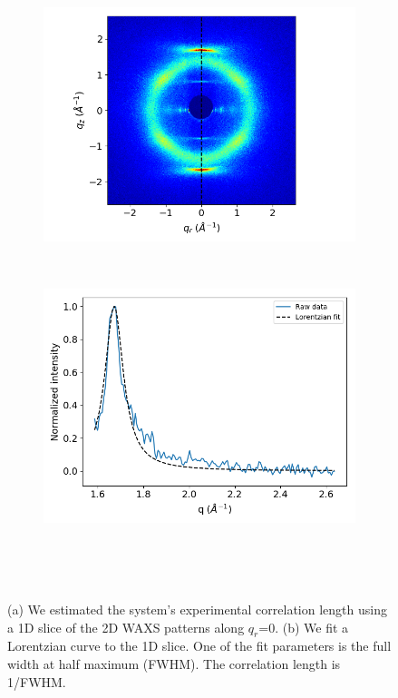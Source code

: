 \documentclass[journal=jpcbfk,manusciprt=article]{achemso}
\begin{document}
  \begin{figure}[!htb]
  \centering
  \begin{subfigure}{0.45\textwidth}	
  	\includegraphics[width=\textwidth]{waxs_dashed.png}
	\caption{}~\label{fig:waxs_dashed}
  \end{subfigure}
  \begin{subfigure}{0.45\textwidth}
	\includegraphics[width=\textwidth]{Correlation_length_exp.png}
	\caption{}~\label{fig:correlation_length_exp}
  \end{subfigure}
  \caption{(a) We estimated the system's experimental correlation length using a 
  1D slice of the 2D WAXS patterns along $q_r$=0. (b) We fit a Lorentzian curve 
  to the 1D slice. One of the fit parameters is the full width at half maximum (FWHM).
  The correlation length is 1/FWHM.}~\label{fig:correlation}
  \end{figure}
  \vspace{1em} \\
\end{document}
